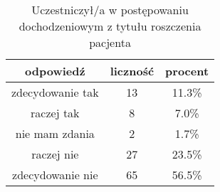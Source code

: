 \begin{table}[H]
\caption{Uczestniczył/a w postępowaniu dochodzeniowym z tytułu roszczenia pacjenta}
\centering
\begin{tabular}{ | c | c | c |}
\hline
odpowiedź & liczność & procent\\
\hline
zdecydowanie tak  &  13  & 11.3\% \\
\hline
raczej tak  &  8  & 7.0\% \\
\hline
nie mam zdania  &  2  & 1.7\% \\
\hline
raczej nie  &  27  & 23.5\% \\
\hline
zdecydowanie nie  &  65  & 56.5\% \\
\hline
\end{tabular}
\label{tab:Q17}
\end{table}
